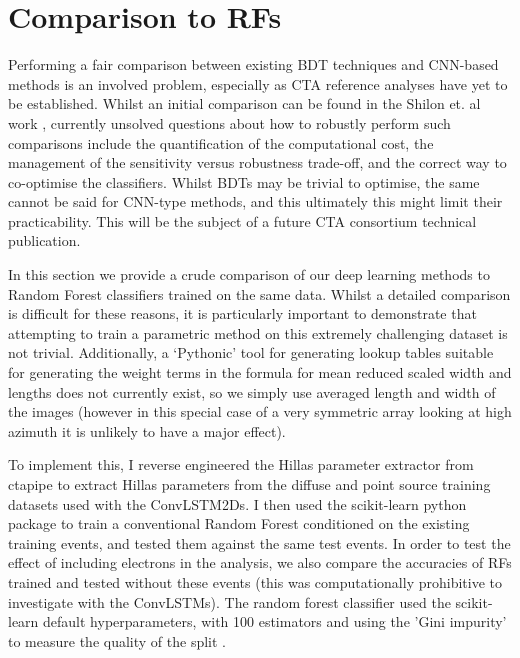 \section{Comparison to RFs}

Performing a fair comparison between existing BDT techniques and CNN-based methods is an involved problem, especially as CTA reference analyses have yet to be established. Whilst an initial comparison can be found in the Shilon et. al work \cite{Shilon}, currently unsolved questions about how to robustly perform such comparisons include the quantification of the computational cost, the management of the sensitivity versus robustness trade-off, and the correct way to co-optimise the classifiers. Whilst BDTs may be trivial to optimise, the same cannot be said for CNN-type methods, and this ultimately this might limit their practicability. This will be the subject of a future CTA consortium technical publication.

In this section we provide a crude comparison of our deep learning methods to Random Forest classifiers trained on the same data. Whilst a detailed comparison is difficult for these reasons, it is particularly important to demonstrate that attempting to train a parametric method on this extremely challenging dataset is not trivial. Additionally, a `Pythonic' tool for generating lookup tables suitable for generating the weight terms in the formula for mean reduced scaled width and lengths does not currently exist, so we simply use averaged length and width of the images (however in this special case of a very symmetric array looking at high azimuth it is unlikely to have a major effect).

To implement this, I reverse engineered the Hillas parameter extractor from ctapipe to extract Hillas parameters from the diffuse and point source training datasets used with the ConvLSTM2Ds. I then used the scikit-learn python package to train a conventional Random Forest conditioned on the existing training events, and tested them against the same test events. In order to test the effect of including electrons in the analysis, we also compare the accuracies of RFs trained and tested without these events (this was computationally prohibitive to investigate with the ConvLSTMs). The random forest classifier used the scikit-learn default hyperparameters, with 100 estimators and using the 'Gini impurity' to measure the quality of the split \cite{scikit}.

